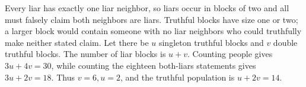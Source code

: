 Every liar has exactly one liar neighbor, so liars occur in blocks of two and all must falsely claim both neighbors are liars. Truthful blocks have size one or two; a larger block would contain someone with no liar neighbors who could truthfully make neither stated claim. Let there be $u$ singleton truthful blocks and $v$ double truthful blocks. The number of liar blocks is $u+v$. Counting people gives $3u+4v=30$, while counting the eighteen both-liars statements gives $3u+2v=18$. Thus $v=6,u=2$, and the truthful population is $u+2v=\boxed{14}$.
